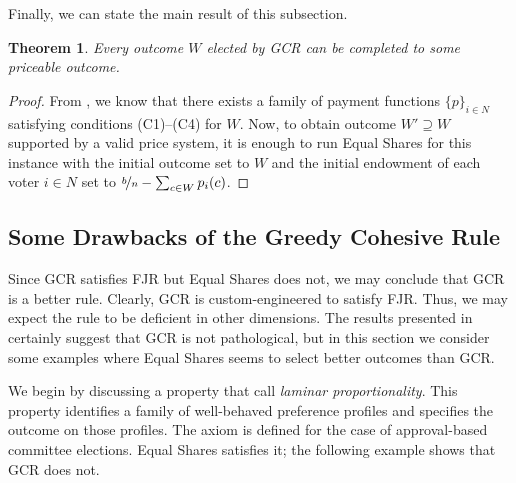 \documentclass[10pt]{scrartcl}
\newcommand{\myemph}[1]{{\color{winered}\emph{#1}}}
\theoremstyle{definition}
\theoremstyle{plain}
\newtheorem{theorem}{Theorem}
\begin{document}
Finally, we can state the main result of this subsection.

\begin{theorem}\label{thm:gcr_priceable}
	Every outcome $W$ elected by GCR can be completed to some priceable outcome.
\end{theorem}
\begin{proof}
	From , we know that there exists a family of payment functions $\{p\}_{i \in N}$ satisfying conditions (C1)--(C4) for $W$. Now, to obtain outcome $W'\supseteq W$ supported by a valid price system, it is enough to run Equal Shares for this instance with the initial outcome set to $W$ and the initial endowment of each voter $i\in N$ set to $\nicefrac{b}{n} - \sum_{c \in W} p_i(c)$.
\end{proof}

\subsection{Some Drawbacks of the Greedy Cohesive Rule}
\label{sec:gcr-drawbacks}
Since GCR satisfies FJR but Equal Shares does not, we may conclude that GCR is a better rule. Clearly, GCR is custom-engineered to satisfy FJR. Thus, we may expect the rule to be deficient in other dimensions. The results presented in  certainly suggest that GCR is not pathological, but in this section we consider some examples where Equal Shares seems to select better outcomes than GCR.

We begin by discussing a property that \citet{pet-sko:laminar} call \myemph{laminar proportionality}. This property identifies a family of well-behaved preference profiles and specifies the outcome on those profiles. The axiom is defined for the case of approval-based committee elections. Equal Shares satisfies it; the following example shows that GCR does not.
\end{document}
